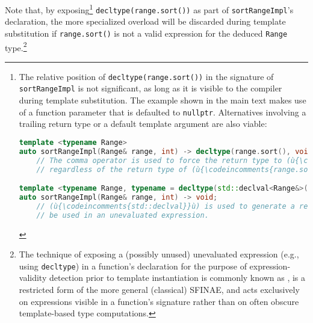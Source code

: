 \noindent Note that, by exposing{\cprotect\footnote{The relative position of
\lstinline!decltype(range.sort())! in the signature of
\lstinline!sortRangeImpl! is not significant, as long as it is visible to
the compiler
during template substitution. The example shown in the main text makes use of a function parameter that is defaulted to
\lstinline!nullptr!. Alternatives involving a trailing return type or a
default template argument are also viable:

%
\begin{lstlisting}[language=C++, basicstyle={\ttfamily\footnotesize}]
template <typename Range>
auto sortRangeImpl(Range& range, int) -> decltype(range.sort(), void());
    // The comma operator is used to force the return type to (ù{\codeincomments{void}}ù),
    // regardless of the return type of (ù{\codeincomments{range.sort()}}ù).

template <typename Range, typename = decltype(std::declval<Range&>().sort())>
auto sortRangeImpl(Range& range, int) -> void;
    // (ù{\codeincomments{std::declval}}ù) is used to generate a reference to (ù{\codeincomments{Range}}ù) that can
    // be used in an unevaluated expression.
\end{lstlisting}
      }} \lstinline!decltype(range.sort())! as part of
\lstinline!sortRangeImpl!'s declaration, the more specialized overload will
be discarded during template substitution if \lstinline!range.sort()! is
not a valid expression for the deduced \lstinline!Range!
type.{\cprotect\footnote{The technique of exposing a (possibly unused)
unevaluated expression (e.g., using \lstinline!decltype!) in a function's
declaration for the purpose of expression-validity detection prior to
template instantiation is commonly known as ,
is a restricted form of the more general (classical) SFINAE, and acts exclusively on
expressions visible in a function's signature rather than on often obscure
  template-based type computations.}}

